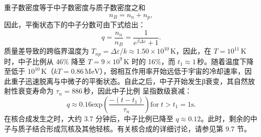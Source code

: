 重子数密度等于中子数密度与质子数密度之和
\begin{equation}\tag{9.4.9}\label{eq:9.4.9}
n _ { B } = n _ { n } + n _ { p } ,
\end{equation}
因此，平衡状态下的中子分数可由下式给出：
\begin{equation}\tag{9.4.10}\label{eq:9.4.10}
q = \frac { n _ { n } } { n _ { B } } = \frac { 1 } { e ^{\beta \Delta \varepsilon} + 1 } .
\end{equation}
质量差导致的跨临界温度为 \(T_{np} = \Delta\varepsilon/k \approx 1.50 \times 10^{10}\,\mathrm{K}\)，因此，在 \(T=10^{11}\,\mathrm{K}\) 时，中子比例从 46\% 降至 \(T=9\times10^{9}\,\mathrm{K}\) 时的 16\%，而 \(t_{1} \approx 1\,\mathrm{秒}\)。随着温度下降至低于 \(10^{10}\,\mathrm{K}\)（\(kT=0.86\,\mathrm{MeV}\)），弱相互作用率开始远低于宇宙的冷却速率，因此重子迅速脱离与中微子的平衡状态。自此之后，中子开始发生β衰变，其自然放射性衰变寿命为 \(\tau_{n}=886\,\mathrm{秒}\)，因此中子比例
呈指数级衰减：
\begin{equation}\tag{9.4.11}\label{eq:9.4.11}
q \approx 0 . 16 \mathrm { e x p } \left( \frac { - ( t - t _ { 1 } ) } { \tau _ { n } } \right)  \mathrm { f o r } \; t > t _ { 1 } = 1 \mathrm { s } .
\end{equation}
在核合成发生之时，大约 3.7 分钟后，中子比例已降至 \(q \approx 0.12\)。此时，剩余的中子与质子结合形成氘核及其他轻核。有关核合成的详细讨论，请参见第 9.7 节。
